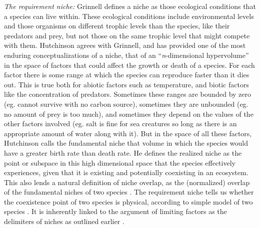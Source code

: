 \emph{The requirement niche:}
Grinnell \cite{Grinnell1917} defines a niche as those ecological conditions that a species can live within. 
These ecological conditions include environmental levels and those organisms on different trophic levels than the species, like their predators and prey, but not those on the same trophic level that might compete with them.
Hutchinson \cite{Hutchinson1961} agrees with Grinnell, and has provided one of the most enduring conceptualizations of a niche, that of an ``\emph{n}-dimensional hypervolume'' in the space of factors that could affect the growth or death of a species.
For each factor there is some range at which the species can reproduce faster than it dies out.
This is true both for abiotic factors such as temperature, and biotic factors like the concentration of predators.
Sometimes these ranges are bounded by zero (eg. cannot survive with no carbon source), sometimes they are unbounded (eg. no amount of prey is too much), and sometimes they depend on the values of the other factors involved (eg. salt is fine for sea creatures so long as there is an appropriate amount of water along with it). 
But in the space of all these factors, Hutchinson calls the fundamental niche that volume in which the species would have a greater birth rate than death rate. 
He defines the realized niche as the point or subspace in this high dimensional space that the species effectively experiences, given that it is existing and potentially coexisting in an ecosystem. 
This also lends a natural definition of niche overlap, as the (normalized) overlap of the fundamental niches of two species \cite{MacArthur1967}. 
The requirement niche tells us whether the coexistence point of two species is physical, according to simple model of two species \cite{Holt1994}. 
It is inherently linked to the argument of limiting factors as the delimiters of niches as outlined earlier \cite{Armstrong1976,McGehee1977a,Armstrong1980}. %

